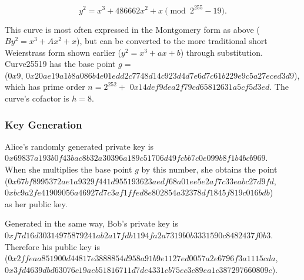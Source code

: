 \documentclass[12pt,a4paper]{article}
\begin{document}
\begin{equation}
    y^2 = x^3 + 486662x^2 + x \pmod{2^{255}-19}.
\end{equation}

This curve is most often expressed in the Montgomery \cite{montgomery1987speeding} form as above ($By^2 = x^3 + Ax^2 + x$), 
but can be converted to the more traditional short Weierstrass form shown earlier ($y^2 = x^3 + ax + b$) through substitution. 
Curve25519 has the base point $g = $ \\
({\footnotesize $0x9$}, {\footnotesize $0x20ae19a1b8a086b4e01edd2c7748d14c923d4d7e6d7c61b229e9c5a27eced3d9$}), \\
which has prime order $n = 2^{252} +$ {\footnotesize $0x14def9dea2f79cd65812631a5cf5d3ed$}. 
The curve's cofactor is $h = 8$. 


\subsubsection{Key Generation}\noindent
Alice's randomly generated private key is \\
{\footnotesize $0x69837a193b0f43bac8b32a30396a189c51706d49fcbb7c0e099b8f1b4bcb969$}. \\
When she multiplies the base point $g$ by this number, she obtains the point \\
({\footnotesize $0x67bf8995372ae1a9329f441d955193623aedf68a01ee5e2af7c33eabc27d9fd$}, \\
{\footnotesize $0xbc9a2fe41909056a46927d7c3af1ffed8e802854a32378df1845f819c016bdb$}) \\
as her public key.

Generated in the same way, Bob's private key is \\
{\footnotesize $0xf7d16d30314975879241ab2a17fdb1194fa2a7319b0b3331590c8482437f0b3$}. \\
Therefore his public key is \\
({\footnotesize $0x2ffeaa851900d44817e3888854d958a91b9e1127ed0057a2e6796f3a1115cda$}, \\
{\footnotesize $0x3fd4639dbd63076c19aeb51816711d7de4331cb75ec3c89ea1c387297660809c$}).
\end{document}
